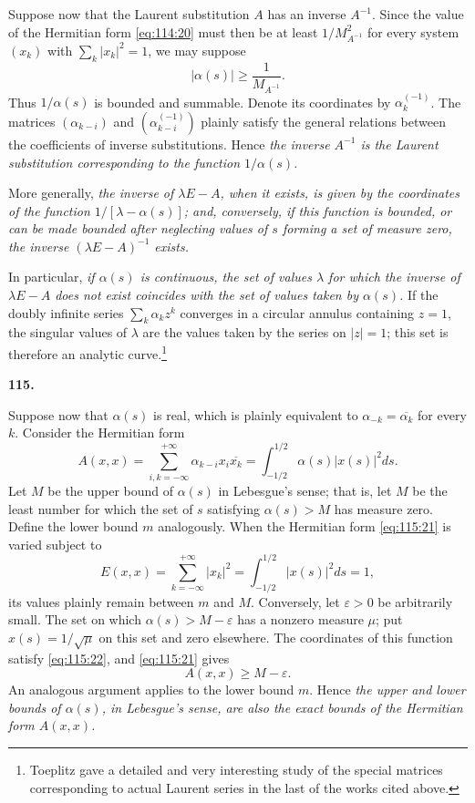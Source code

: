 \documentclass[
  paper=b5,
  fontsize=13pt,
  twoside=true,
  open=any,
  bookmarkpackage=false,
  chapterprefix=true,
  headings=normal
]{scrbook}
\theoremstyle{definition}
\newcommand{\numberedparagraph}[1]{%
  \par\medskip\phantomsection\label{sec:#1}%
  \noindent\textbf{#1.}\enspace
}
\begin{document}
Suppose now that the Laurent substitution \(A\) has an inverse \(A^{-1}\).
Since the value of the Hermitian form \eqref{eq:114:20} must then be at least
\(1/M_{A^{-1}}^2\) for every system \((x_k)\) with
\(\sum_k|x_k|^2=1\), we may suppose
\[
  |\alpha(s)|\ge\frac1{M_{A^{-1}}}.
\]
Thus \(1/\alpha(s)\) is bounded and summable.  Denote its coordinates by
\(\alpha_k^{(-1)}\).  The matrices
\((\alpha_{k-i})\) and \((\alpha_{k-i}^{(-1)})\) plainly satisfy the general
relations between the coefficients of inverse substitutions.  Hence
\emph{the inverse \(A^{-1}\) is the Laurent substitution corresponding to
the function \(1/\alpha(s)\).}

More generally, \emph{the inverse of \(\lambda E-A\), when it exists, is
given by the coordinates of the function \(1/[\lambda-\alpha(s)]\); and,
conversely, if this function is
bounded, or can be made bounded after neglecting values of \(s\) forming a
set of measure zero, the inverse \((\lambda E-A)^{-1}\) exists.}

In particular, \emph{if \(\alpha(s)\) is continuous, the set of values
\(\lambda\) for which the inverse of \(\lambda E-A\) does not exist coincides
with the set of values taken by \(\alpha(s)\).}  If the doubly infinite series
\(\sum_k\alpha_kz^k\) converges in a circular annulus containing \(z=1\), the
singular values of \(\lambda\) are the values taken by the series on
\(|z|=1\); this set is therefore an analytic curve.\footnote{Toeplitz gave a
detailed and very interesting study of the special matrices corresponding to
actual Laurent series in the last of the works cited above.}

\numberedparagraph{115}
Suppose now that \(\alpha(s)\) is real, which is plainly equivalent to
\(\alpha_{-k}=\overline{\alpha_k}\) for every \(k\).  Consider the Hermitian
form
\begin{equation}
  A(x,x)=\sum_{i,k=-\infty}^{+\infty}
  \alpha_{k-i}x_i\overline{x_k}
  =\int_{-1/2}^{1/2}\alpha(s)|x(s)|^2ds.
  \tag{21}\label{eq:115:21}
\end{equation}
Let \(M\) be the upper bound of \(\alpha(s)\) in Lebesgue's sense; that is,
let \(M\) be the least number for which the set of \(s\) satisfying
\(\alpha(s)>M\) has measure zero.  Define the lower bound \(m\) analogously.
When the Hermitian form \eqref{eq:115:21} is varied subject to
\begin{equation}
  E(x,x)=\sum_{k=-\infty}^{+\infty}|x_k|^2
  =\int_{-1/2}^{1/2}|x(s)|^2ds=1,
  \tag{22}\label{eq:115:22}
\end{equation}
its values plainly remain between \(m\) and \(M\).  Conversely, let
\(\varepsilon>0\) be arbitrarily small.  The set on which
\(\alpha(s)>M-\varepsilon\) has a nonzero measure \(\mu\); put
\(x(s)=1/\sqrt\mu\) on this set and zero elsewhere.  The coordinates of this
function satisfy
\eqref{eq:115:22}, and \eqref{eq:115:21} gives
\[
  A(x,x)\ge M-\varepsilon.
\]
An analogous argument applies to the lower bound \(m\).  Hence \emph{the
upper and lower bounds of \(\alpha(s)\), in Lebesgue's sense, are also the
exact bounds of the Hermitian form \(A(x,x)\).}
\end{document}
